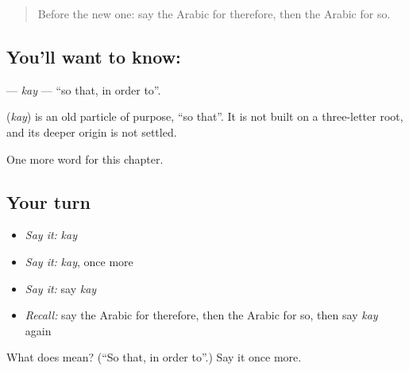 \label{lesson:AR-C174-kay}



\begin{quote}
Before the new one: say the Arabic for therefore, then the Arabic for so.
\end{quote}

\subsection*{You'll want to know: }
\textbf{} — \emph{kay} — \textquotedblleft{}so that, in order to\textquotedblright{}.

\begin{cousinweb}
\textbf{} (\emph{kay}) is an old particle of purpose, \textquotedblleft{}so that\textquotedblright{}. It is not built on a three-letter root, and its deeper origin is not settled.
\end{cousinweb}

\begin{grammarlens}[title={What you've built}]
One more word for this chapter.
\end{grammarlens}

\subsection*{Your turn}
\begin{itemize}
\raggedright
  \item \emph{Say it:} \emph{kay}
  \item \emph{Say it:} \emph{kay}, once more
  \item \emph{Say it:} say \emph{kay}
  \item \emph{Recall:} say the Arabic for therefore, then the Arabic for so, then say \emph{kay} again
\end{itemize}

\begin{tcolorbox}[breakable,colback=teal!4,colframe=teal!35!black,title={Before you move on}]
What does  mean? (\textquotedblleft{}So that, in order to\textquotedblright{}.) Say it once more.
\end{tcolorbox}
